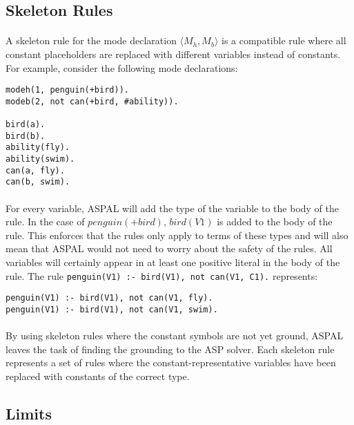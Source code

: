 \documentclass{article}
\theoremstyle{plain}
\theoremstyle{definition}
\begin{document}
\begin{multicols}{2}
\subsection{Skeleton Rules}

\paragraph{} A skeleton rule for the mode declaration $\langle M_h, M_b \rangle$ is a compatible rule where all constant placeholders are replaced with different variables instead of constants. For example, consider the following mode declarations:

\begin{lstlisting}
modeh(1, penguin(+bird)).
modeb(2, not can(+bird, #ability)).

bird(a).
bird(b).
ability(fly).
ability(swim).
can(a, fly).
can(b, swim).
\end{lstlisting}

\paragraph{} For every variable, ASPAL will add the type of the variable to the body of the rule. In the case of $penguin(+bird)$, $bird(V1)$ is added to the body of the rule. This enforces that the rules only apply to terms of these types and will also mean that ASPAL would not need to worry about the safety of the rules. All variables will certainly appear in at least one positive literal in the body of the rule. The rule  \lstinline{penguin(V1) :- bird(V1), not can(V1, C1).} represents:

\begin{lstlisting}
penguin(V1) :- bird(V1), not can(V1, fly).
penguin(V1) :- bird(V1), not can(V1, swim).
\end{lstlisting}

\paragraph{} By using skeleton rules where the constant symbols are not yet ground, ASPAL leaves the task of finding the grounding to the ASP solver. Each skeleton rule represents a set of rules where the constant-representative variables have been replaced with constants of the correct type.

\subsection{Limits}


\end{multicols}
\end{document}
